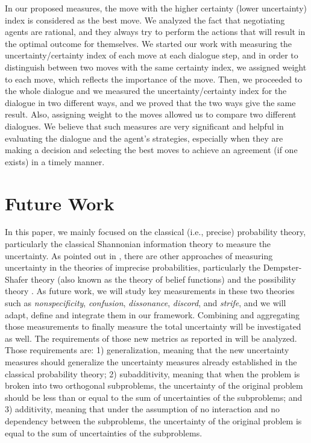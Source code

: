 In our proposed measures, the move with the higher certainty (lower uncertainty) index is considered as the best move. We analyzed
the fact that negotiating agents are rational, and they always try to perform the actions that will result in the optimal outcome
for themselves. We started our work with measuring the uncertainty/certainty index of each move at each dialogue step, and in order
to distinguish between two moves with the same certainty index, we assigned weight to each move, which reflects the importance of the
move. Then, we proceeded to the whole dialogue and we measured the uncertainty/certainty index for the dialogue in two different ways,
and we proved that the two ways give the same result. Also, assigning weight to the moves allowed us to compare two different dialogues.
We believe that such measures are very significant and helpful in evaluating the dialogue and the agent's strategies, especially when
they are making a decision and selecting the best moves to achieve an agreement (if one exists) in a timely manner.



\section{Future Work}\label{sec:future}
In this paper, we mainly focused on the classical (i.e., precise) probability theory, particularly the classical Shannonian
information theory to measure the uncertainty. As pointed out in \cite{Harmanec1999}, there are other approaches of measuring
uncertainty in the theories of imprecise probabilities, particularly the Dempster-Shafer theory (also known as the theory
of belief functions) \cite{Shafer76} and the possibility theory \cite{Dubois2001}. As future work, we will study key measurements
in these two theories such as \emph{nonspecificity}, \emph{confusion}, \emph{dissonance}, \emph{discord}, and \emph{strife}, and
we will adapt, define and integrate them in our framework. Combining and aggregating those measurements to finally measure the
total uncertainty will be investigated as well. The requirements of those new metrics as reported in \cite{Harmanec1999} will be
analyzed. Those requirements are: 1) generalization, meaning that the new uncertainty measures should generalize the uncertainty
measures already established in the classical probability theory; 2) subadditivity, meaning that when the problem is broken into
two orthogonal subproblems, the uncertainty of the original problem should be less than or equal to the sum of uncertainties of the
subproblems; and 3) additivity, meaning that under the assumption of no interaction and no dependency between the subproblems, the
uncertainty of the original problem is equal to the sum of uncertainties of the subproblems.

